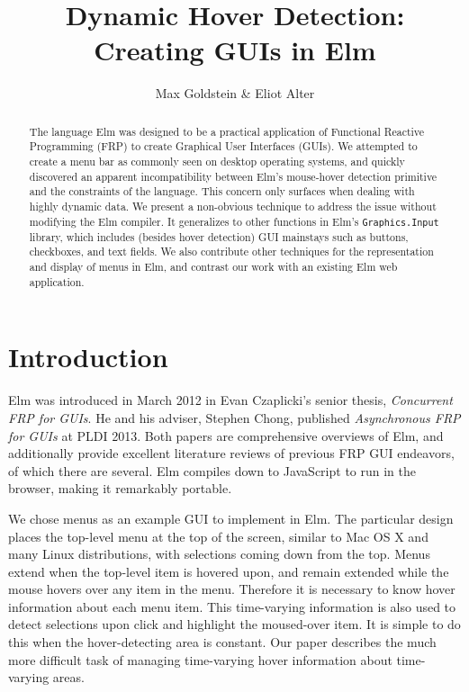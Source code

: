 \documentclass{article}
\title{\textbf{Dynamic Hover Detection:\\Creating GUIs in Elm}}
\author{Max Goldstein \& Eliot Alter}
\makeatletter
\renewcommand{\maketitle}{ %
    \begin{flushright} %
        {\LARGE\@title} %

        \vspace{40pt} %

        {\large\@author} %

        \vspace{30pt} %
    \end{flushright}
}
\makeatother
\begin{document}
\thispagestyle{empty} %
\maketitle

\begin{abstract}
The language Elm was designed to be a practical application of
Functional Reactive Programming (FRP) to create Graphical User
Interfaces (GUIs). We attempted to create a menu bar as commonly seen on
desktop operating systems, and quickly discovered an apparent
incompatibility between Elm's mouse-hover detection primitive and the
constraints of the language. This concern only surfaces when dealing
with highly dynamic data. We present a non-obvious technique to address
the issue without modifying the Elm compiler. It generalizes to other
functions in Elm's \texttt{Graphics.Input} library, which includes
(besides hover detection) GUI mainstays such as buttons, checkboxes, and
text fields. We also contribute other techniques for the representation and
display of menus in Elm, and contrast our work with an existing Elm web
application.
\end{abstract}

\section{Introduction}\label{introduction}

Elm was introduced in March 2012 in Evan Czaplicki's senior thesis,
\emph{Concurrent FRP for GUIs}. \cite{elm-thesis} He and his adviser, Stephen
Chong, published \emph{Asynchronous FRP for GUIs} at PLDI
2013. \cite{CzaplickiC13} Both papers are comprehensive overviews of Elm, and
additionally provide excellent literature reviews of previous FRP GUI endeavors,
of which there are several.  Elm compiles down to JavaScript to run in the
browser, making it remarkably portable.

We chose menus as an example GUI to implement in Elm. The particular
design places the top-level menu at the top of the screen, similar to
Mac OS X and many Linux distributions, with selections coming down from
the top. Menus extend when the top-level item is hovered upon, and
remain extended while the mouse hovers over any item in the menu.
Therefore it is necessary to know hover information about each menu
item. This time-varying information is also used to detect selections
upon click and highlight the moused-over item. It is simple to do this
when the hover-detecting area is constant. Our paper describes the much
more difficult task of managing time-varying hover information about
time-varying areas.
\end{document}
